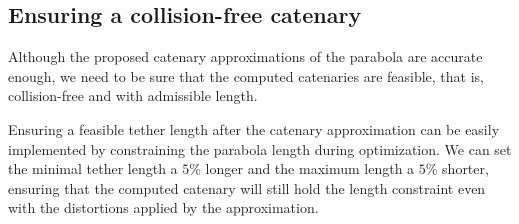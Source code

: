 

\subsection{Ensuring a collision-free catenary}

Although the proposed catenary approximations of the parabola are accurate enough, we need to be sure that the computed catenaries are feasible, that is, collision-free and with admissible length.

Ensuring a feasible tether length after the catenary approximation can be easily implemented by constraining the parabola length during optimization. We can set the minimal tether length a $5\%$ longer and the maximum length a $5\%$ shorter, ensuring that the computed catenary will still hold the length constraint even with the distortions applied by the approximation.

